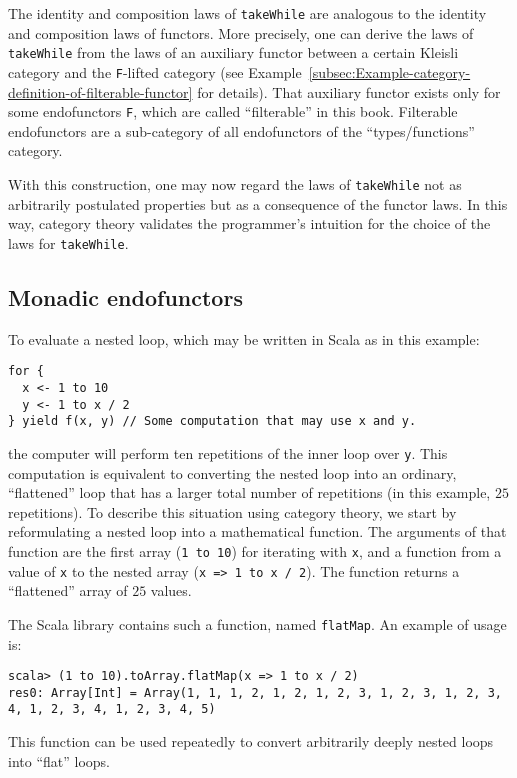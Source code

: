 The identity and composition laws of \lstinline!takeWhile! are analogous
to the identity and composition laws of functors. More precisely,
one can derive the laws of \lstinline!takeWhile! from the laws of
an auxiliary functor between a certain Kleisli category and the \lstinline!F!-lifted
category (see Example~\ref{subsec:Example-category-definition-of-filterable-functor}
for details). That auxiliary functor exists only for some endofunctors
\lstinline!F!, which are called \textsf{``}filterable\textsf{''} in this book. Filterable
endofunctors are a sub-category of all endofunctors of the \textsf{``}types/functions\textsf{''}
category. 

With this construction, one may now regard the laws of \lstinline!takeWhile!
not as arbitrarily postulated properties but as a consequence of the
functor laws. In this way, category theory validates the programmer\textsf{'}s
intuition for the choice of the laws for \lstinline!takeWhile!.

\subsection*{Monadic endofunctors}

To evaluate a nested loop, which may be written in Scala as in this
example:
\begin{lstlisting}
for {
  x <- 1 to 10
  y <- 1 to x / 2
} yield f(x, y) // Some computation that may use x and y.
\end{lstlisting}
the computer will perform ten repetitions of the inner loop over \lstinline!y!.
This computation is equivalent to converting the nested loop into
an ordinary, \textsf{``}flattened\textsf{''} loop that has a larger total number of
repetitions (in this example, $25$ repetitions). To describe this
situation using category theory, we start by reformulating a nested
loop into a mathematical function. The arguments of that function
are the first array (\lstinline!1 to 10!) for iterating with \lstinline!x!,
and a function from a value of \lstinline!x! to the nested array
(\lstinline!x => 1 to x / 2!). The function returns a \textsf{``}flattened\textsf{''}
array of $25$ values. 

The Scala library contains such a function, named \lstinline!flatMap!.
An example of usage is:
\begin{lstlisting}
scala> (1 to 10).toArray.flatMap(x => 1 to x / 2)
res0: Array[Int] = Array(1, 1, 1, 2, 1, 2, 1, 2, 3, 1, 2, 3, 1, 2, 3, 4, 1, 2, 3, 4, 1, 2, 3, 4, 5)
\end{lstlisting}
This function can be used repeatedly to convert arbitrarily deeply
nested loops into \textsf{``}flat\textsf{''} loops.

